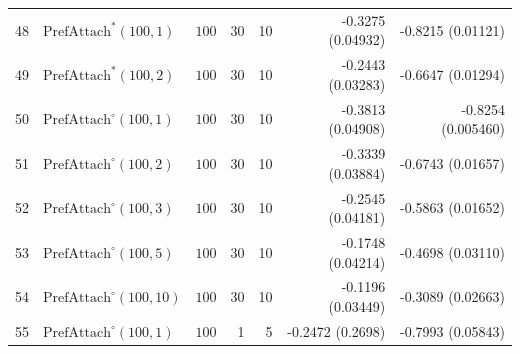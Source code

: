 \documentclass[review]{elsarticle}
\numberwithin{equation}{section}
\begin{document}
\begin{table}
\begin{center}
{\begin{tabular}{l|lrrrrr}
48  & $\mathrm{PrefAttach}^*(100,1)$ & $100$ & 30 & 10 & -0.3275 (0.04932) & -0.8215 (0.01121)\\
49  & $\mathrm{PrefAttach}^*(100,2)$ & $100$ & 30 & 10 & -0.2443 (0.03283) & -0.6647 (0.01294)\\
50  & $\mathrm{PrefAttach}^{\circ}(100,1)$ & $100$ & 30 & 10 & -0.3813 (0.04908) & -0.8254 (0.005460) \\
51  & $\mathrm{PrefAttach}^{\circ}(100,2)$ & $100$ & 30 & 10 & -0.3339 (0.03884) & -0.6743 (0.01657) \\
52  & $\mathrm{PrefAttach}^{\circ}(100,3)$ & $100$ & 30 & 10 & -0.2545 (0.04181) & -0.5863 (0.01652) \\
53  & $\mathrm{PrefAttach}^{\circ}(100,5)$ & $100$ & 30 & 10 & -0.1748 (0.04214) & -0.4698 (0.03110) \\
54  & $\mathrm{PrefAttach}^{\circ}(100,10)$ & $100$ & 30 & 10 & -0.1196 (0.03449) & -0.3089 (0.02663)  \\
55  & $\mathrm{PrefAttach}^{\circ}(100,1)$ & $100$ & 1 & 5 & -0.2472 (0.2698) & -0.7993 (0.05843) \\
\hline
\end{tabular}
}
\end{center}
\end{table}
\end{document}
